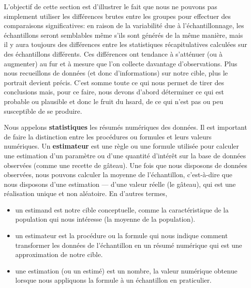 \documentclass[
  11pt,
  letterpaper,
]{scrbook}
\providecommand{\tightlist}{%
  \setlength{\itemsep}{0pt}\setlength{\parskip}{0pt}}\usepackage{longtable,booktabs,array}
\theoremstyle{plain}
\theoremstyle{plain}
\theoremstyle{definition}
\theoremstyle{definition}
\theoremstyle{remark}
\begin{document}
L'objectif de cette section est d'illustrer le fait que nous ne pouvons
pas simplement utiliser les différences brutes entre les groupes pour
effectuer des comparaisons significatives: en raison de la variabilité
due à l'échantillonnage, les échantillons seront semblables même s'ils
sont générés de la même manière, mais il y aura toujours des différences
entre les statistiques récapitulatives calculées sur des échantillons
différents. Ces différences ont tendance à s'atténuer (ou à augmenter)
au fur et à mesure que l'on collecte davantage d'observations. Plus nous
recueillons de données (et donc d'informations) sur notre cible, plus le
portrait devient précis. C'est somme toute ce qui nous permet de tirer
des conclusions mais, pour ce faire, nous devons d'abord déterminer ce
qui est probable ou plausible et donc le fruit du hsard, de ce qui n'est
pas ou peu susceptible de se produire.

Nous appelons \textbf{statistiques} les résumés numériques des données.
Il est important de faire la distinction entre les procédures ou
formules et leurs valeurs numériques. Un \textbf{estimateur} est une
règle ou une formule utilisée pour calculer une estimation d'un
paramètre ou d'une quantité d'intérêt sur la base de données observées
(comme une recette de gâteau). Une fois que nous disposons de données
observées, nous pouvons calculer la moyenne de l'échantillon,
c'est-à-dire que nous disposons d'une estimation --- d'une valeur réelle
(le gâteau), qui est une réalisation unique et non aléatoire. En
d'autres termes,

\begin{itemize}
\tightlist
\item
  un estimand est notre cible conceptuelle, comme la caractéristique de
  la population qui nous intéresse (la moyenne de la population).
\item
  un estimateur est la procédure ou la formule qui nous indique comment
  transformer les données de l'échantillon en un résumé numérique qui
  est une approximation de notre cible.
\item
  une estimation (ou un estimé) est un nombre, la valeur numérique
  obtenue lorsque nous appliquons la formule à un échantillon en
  praticulier.
\end{itemize}
\end{document}
